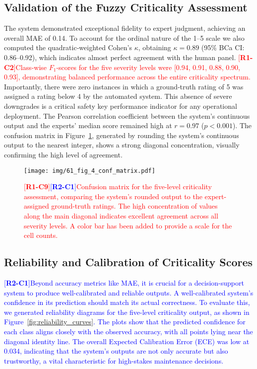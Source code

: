 \documentclass[energies,article,submit,pdftex,moreauthors]{Definitions/mdpi}
\newcommand{\revtag}[2]{[\textbf{R#1-C#2}]}
\newcommand{\Rone}[1]{\textcolor{red}{#1}}
\newcommand{\Rtwo}[1]{\textcolor{blue}{#1}}
\begin{document}
\subsection{Validation of the Fuzzy Criticality Assessment}
The system demonstrated exceptional fidelity to expert judgment, achieving an overall MAE of 0.14. To account for the ordinal nature of the 1–5 scale we also computed the quadratic‑weighted Cohen’s \(\kappa\), obtaining \(\kappa = 0.89\) (95\% BCa CI: 0.86–0.92), which indicates almost perfect agreement with the human panel. \Rone{\revtag{1}{2}Class‑wise \(F_{1}\)-scores for the five severity levels were [0.94, 0.91, 0.88, 0.90, 0.93], demonstrating balanced performance across the entire criticality spectrum.} Importantly, there were zero instances in which a ground‑truth rating of 5 was assigned a rating below 4 by the automated system. This absence of severe downgrades is a critical safety key performance indicator for any operational deployment. The Pearson correlation coefficient between the system's continuous output and the experts' median score remained high at \(r=0.97\) (\(p < 0.001\)). The confusion matrix in Figure~\ref{fig:confusion_matrix}, generated by rounding the system’s continuous output to the nearest integer, shows a strong diagonal concentration, visually confirming the high level of agreement.

\begin{figure}[H]
\centering
\texttt{[image: img/61\_fig\_4\_conf\_matrix.pdf]}
\caption{\Rone{\revtag{1}{9}\Rtwo{\revtag{2}{1}}Confusion matrix for the five-level criticality assessment, comparing the system's rounded output to the expert-assigned ground-truth ratings. The high concentration of values along the main diagonal indicates excellent agreement across all severity levels. A color bar has been added to provide a scale for the cell counts.}}
\label{fig:confusion_matrix}
\end{figure}

\subsection{Reliability and Calibration of Criticality Scores}
\Rtwo{\revtag{2}{1}Beyond accuracy metrics like MAE, it is crucial for a decision-support system to produce well-calibrated and reliable outputs. A well-calibrated system's confidence in its prediction should match its actual correctness. To evaluate this, we generated reliability diagrams for the five-level criticality output, as shown in Figure~\ref{fig:reliability_curves}. The plots show that the predicted confidence for each class aligns closely with the observed accuracy, with all points lying near the diagonal identity line. The overall Expected Calibration Error (ECE) was low at 0.034, indicating that the system's outputs are not only accurate but also trustworthy, a vital characteristic for high-stakes maintenance decisions.}
\end{document}

